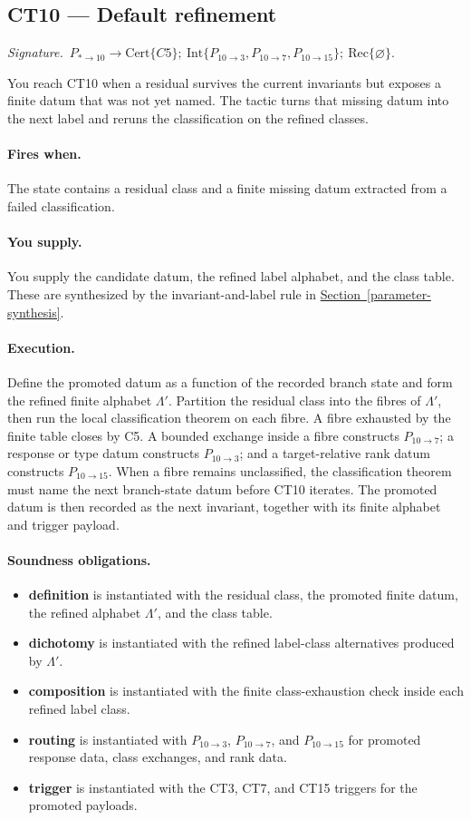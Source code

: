 \documentclass[
  11pt,
]{article}
\providecommand{\tightlist}{%
  \setlength{\itemsep}{0pt}\setlength{\parskip}{0pt}}
\theoremstyle{definition}
\newcommand{\secref}[1]{\hyperref[#1]{Section~\ref*{#1}}}
\newcommand{\ctsignature}[1]{\par\noindent\emph{Signature.}\ #1\par\medskip}
\newcommand{\ctcert}[1]{\mathrm{Cert}\{#1\}}
\newcommand{\ctint}[1]{\mathrm{Int}\{#1\}}
\newcommand{\ctrec}[1]{\mathrm{Rec}\{#1\}}
\newcommand{\ctnone}{\varnothing}
\newcommand{\ctpar}[1]{\paragraph{#1.}}
\begin{document}
\subsection{CT10 --- Default refinement}\label{ct:10}\label{the-default-refinement}
\ctsignature{\(P_{\ast\to10}\to \ctcert{C5};\ \ctint{P_{10\to3},P_{10\to7},P_{10\to15}};\ \ctrec{\ctnone}\).}

You reach CT10 when a residual survives the current invariants but
exposes a finite datum that was not yet named.  The tactic turns that
missing datum into the next label and reruns the classification on the
refined classes.

\ctpar{Fires when}
The state contains a residual class and a finite missing datum extracted
from a failed classification.

\ctpar{You supply}
You supply the candidate datum, the refined label alphabet, and the class
table.  These are synthesized by the invariant-and-label rule in
\secref{parameter-synthesis}.

\ctpar{Execution}
Define the promoted datum as a function of the recorded branch state and
form the refined finite alphabet \(\Lambda'\).  Partition the residual
class into the fibres of \(\Lambda'\), then run the local classification
theorem on each fibre.  A fibre exhausted by the finite table closes by
C5.  A bounded exchange inside a fibre constructs \(P_{10\to7}\); a
response or type datum constructs \(P_{10\to3}\); and a target-relative
rank datum constructs \(P_{10\to15}\).  When a fibre remains
unclassified, the classification theorem must name the next branch-state
datum before CT10 iterates.  The promoted datum is then recorded as the
next invariant, together with its finite alphabet and trigger payload.

\ctpar{Soundness obligations}
\begin{itemize}
\tightlist
\item \textbf{definition} is instantiated with the residual class, the promoted finite datum, the refined alphabet \(\Lambda'\), and the class table.
\item \textbf{dichotomy} is instantiated with the refined label-class alternatives produced by \(\Lambda'\).
\item \textbf{composition} is instantiated with the finite class-exhaustion check inside each refined label class.
\item \textbf{routing} is instantiated with \(P_{10\to3}\), \(P_{10\to7}\), and \(P_{10\to15}\) for promoted response data, class exchanges, and rank data.
\item \textbf{trigger} is instantiated with the CT3, CT7, and CT15 triggers for the promoted payloads.
\end{itemize}
\end{document}
